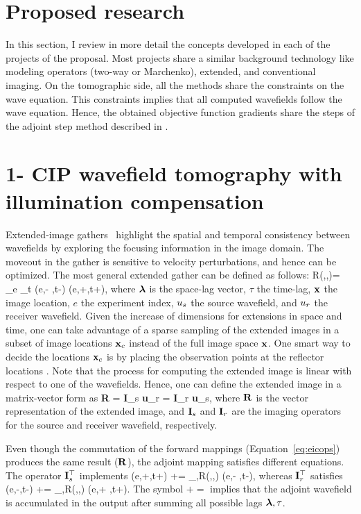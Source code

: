 \newpage
\section{Proposed research}

In this section, I review in more detail the concepts developed in each 
of the projects of the proposal. Most projects share a similar background
technology like modeling operators (two-way or Marchenko), extended, and 
conventional imaging. On the tomographic side, all the methods
share the constraints on the wave equation. This constraints implies that all
computed wavefields follow the wave equation. Hence,  the 
obtained objective function gradients share the steps of the adjoint step method 
described in \cite{plessix}. 

\section{1- CIP wavefield tomography with illumination compensation}

Extended-image gathers~\citep{rickett:883,SavaVasconselos}
highlight the spatial and temporal consistency between wavefields by exploring
 the focusing information in the image domain. 
 The moveout in the gather is sensitive to
velocity perturbations, and hence can be optimized. The most
general extended gather can be defined as follows:
\beq
R(\xx,\hh,\tau)= \sum_{{e}} \sum_{t} \US({e},\xx - \hh,t-\tau) \UR({e},\xx+\hh,t+\tau),
\label{eq:eic}
\eeq
 where ${\boldsymbol{\lambda}}$ is the space-lag vector, $\tau$ the time-lag, ${\bf x}$ the image location, $e$ the
experiment index, $u_s$ the 
 source wavefield, and $u_r$ the receiver wavefield. Given the increase of dimensions 
for extensions in space and time, one can take advantage of a sparse sampling 
of the extended images in a subset of image locations ${\bf x}_c$ instead of the full image space ${\bf x}$. One smart
way to  decide the locations ${\bf x}_c$ is by placing the observation points at the reflector
locations \citep{cullison}.  
 Note that the process for computing the extended
image is linear with respect to one of the wavefields. Hence, one can 
define the extended image in a matrix-vector form as 
\beq
  {\bf R} = {\bf I}_{s} {\bf u}_r = {\bf I}_{r} {\bf u}_s,
\label{eq:eicops}
\eeq
where $\bf R$ is the vector representation of the extended image, and 
 ${\bf I}_s$ and ${\bf I}_r$ are the imaging operators for the source and receiver wavefield,
respectively. 

Even though the commutation of the forward mappings (Equation~\ref{eq:eicops})
 produces the same result ($\bf R$), the adjoint 
mapping satisfies different equations. The operator ${\bf I}_s^\top$ implements
\beq
  \tilde{\UR}(e,\xx+\hh,t+\tau) += \sum_{\tau,\hh}R(\xx,\hh,\tau) \US(e,\xx - \hh,t-\tau),
\label{eq:adj1}
\eeq
whereas ${\bf I}_r^\top$ satisfies
\beq
  \tilde{\US}(e,\xx-\hh,t-\tau) += \sum_{\tau,\hh}R(\xx,\hh,\tau) \UR(e,\xx + \hh,t+\tau).
\eeq
The symbol $+=$ implies that the adjoint wavefield is accumulated in the output after
summing all possible lags ${\boldsymbol{\lambda}},\tau$.


